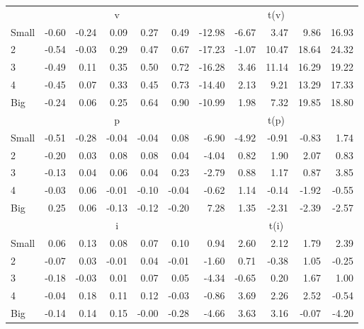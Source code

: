 \begin{table}[!ht]
\begin{tabular}{lrrrrrrrrrr}
  
     & \multicolumn{5}{c}{v} & \multicolumn{5}{c}{t(v)}   \\
     \cmidrule(r){2-6} \cmidrule(r){7-11} 
    Small  & -0.60  & -0.24  & 0.09  & 0.27  & 0.49  & -12.98  & -6.67  & 3.47  & 9.86  & 16.93   \\
    2  & -0.54  & -0.03  & 0.29  & 0.47  & 0.67  & -17.23  & -1.07  & 10.47  & 18.64  & 24.32   \\
    3  & -0.49  & 0.11  & 0.35  & 0.50  & 0.72  & -16.28  & 3.46  & 11.14  & 16.29  & 19.22   \\
    4  & -0.45  & 0.07  & 0.33  & 0.45  & 0.73  & -14.40  & 2.13  & 9.21  & 13.29  & 17.33   \\
    Big  & -0.24  & 0.06  & 0.25  & 0.64  & 0.90  & -10.99  & 1.98  & 7.32  & 19.85  & 18.80   \\
    
  
     & \multicolumn{5}{c}{p} & \multicolumn{5}{c}{t(p)}   \\
     \cmidrule(r){2-6} \cmidrule(r){7-11} 
    Small  & -0.51  & -0.28  & -0.04  & -0.04  & 0.08  & -6.90  & -4.92  & -0.91  & -0.83  & 1.74   \\
    2  & -0.20  & 0.03  & 0.08  & 0.08  & 0.04  & -4.04  & 0.82  & 1.90  & 2.07  & 0.83   \\
    3  & -0.13  & 0.04  & 0.06  & 0.04  & 0.23  & -2.79  & 0.88  & 1.17  & 0.87  & 3.85   \\
    4  & -0.03  & 0.06  & -0.01  & -0.10  & -0.04  & -0.62  & 1.14  & -0.14  & -1.92  & -0.55   \\
    Big  & 0.25  & 0.06  & -0.13  & -0.12  & -0.20  & 7.28  & 1.35  & -2.31  & -2.39  & -2.57   \\
    
  
     & \multicolumn{5}{c}{i} & \multicolumn{5}{c}{t(i)}   \\
     \cmidrule(r){2-6} \cmidrule(r){7-11} 
    Small  & 0.06  & 0.13  & 0.08  & 0.07  & 0.10  & 0.94  & 2.60  & 2.12  & 1.79  & 2.39   \\
    2  & -0.07  & 0.03  & -0.01  & 0.04  & -0.01  & -1.60  & 0.71  & -0.38  & 1.05  & -0.25   \\
    3  & -0.18  & -0.03  & 0.01  & 0.07  & 0.05  & -4.34  & -0.65  & 0.20  & 1.67  & 1.00   \\
    4  & -0.04  & 0.18  & 0.11  & 0.12  & -0.03  & -0.86  & 3.69  & 2.26  & 2.52  & -0.54   \\
    Big  & -0.14  & 0.14  & 0.15  & -0.00  & -0.28  & -4.66  & 3.63  & 3.16  & -0.07  & -4.20   \\
    

\end{tabular}
\end{table}
